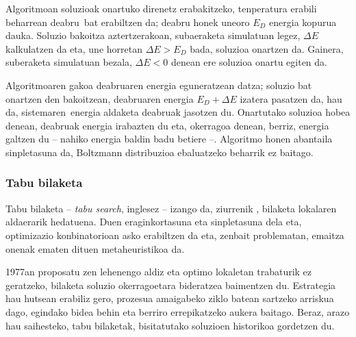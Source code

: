 \documentclass[eu]{ifirak}\usepackage[]{graphicx}\usepackage[]{color}
\newcommand{\zkk}{\guillemotleft}
\newcommand{\skk}{\guillemotright}
\begin{document}
Algoritmoan soluzioak onartuko direnetz erabakitzeko, tenperatura erabili beharrean \zkk deabru\skk\ bat erabiltzen da; deabru honek uneoro $E_D$ energia kopurua dauka. Soluzio bakoitza aztertzerakoan, subaeraketa simulatuan legez, $\Delta E$ kalkulatzen da eta, une horretan $\Delta E>E_D$ bada, soluzioa onartzen da. Gainera, suberaketa simulatuan bezala, $\Delta E<0$ denean ere soluzioa onartu egiten da. 

Algoritmoaren gakoa deabruaren energia eguneratzean datza; soluzio bat onartzen den bakoitzean, deabruaren energia $E_D + \Delta E$ izatera pasatzen da, hau da, \zkk sistemaren\skk\ energia aldaketa deabruak jasotzen du. Onartutako soluzioa hobea denean, deabruak energia irabazten du eta, okerragoa denean, berriz, energia galtzen du -- nahiko energia baldin badu betiere --. Algoritmo honen abantaila sinpletasuna da, Boltzmann distribuzioa ebaluatzeko beharrik ez baitago.

\subsubsection{Tabu bilaketa}

Tabu bilaketa -- \textit{tabu search}, inglesez -- izango da, ziurrenik , bilaketa lokalaren aldaerarik hedatuena. Duen eraginkortasuna eta sinpletasuna dela eta, optimizazio konbinatorioan asko erabiltzen da eta, zenbait problematan, emaitza onenak ematen dituen metaheuristikoa da.

1977an proposatu zen lehenengo aldiz eta optimo lokaletan trabaturik ez geratzeko, bilaketa soluzio okerragoetara bideratzea baimentzen du. Estrategia hau hutsean erabiliz gero, prozesua amaigabeko ziklo batean sartzeko arriskua dago, egindako bidea behin eta berriro errepikatzeko aukera baitago. Beraz, arazo hau saihesteko, tabu bilaketak, bisitatutako soluzioen historikoa gordetzen du.
\end{document}
